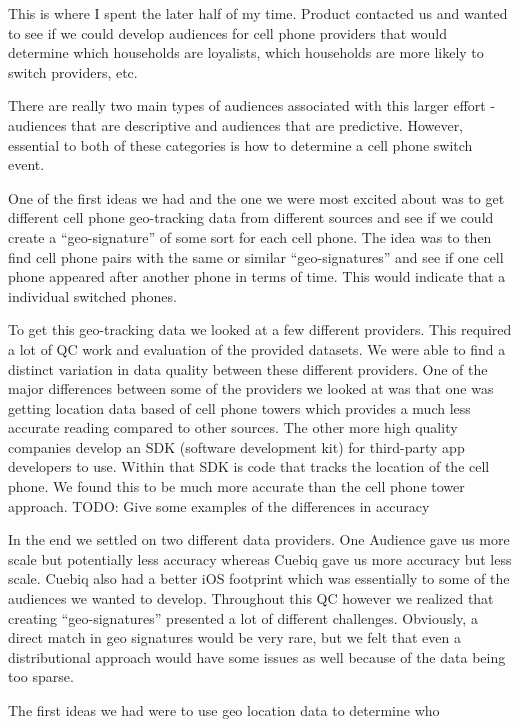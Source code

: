 \documentclass[paper=a4, fontsize=11pt]{scrartcl} %
\numberwithin{equation}{section} %
\numberwithin{figure}{section} %
\numberwithin{table}{section} %
\begin{document}
This is where I spent the later half of my time. Product contacted us and wanted to see if we could develop audiences for cell phone providers that would determine which households are loyalists, which households are more likely to switch providers, etc.

There are really two main types of audiences associated with this larger effort - audiences that are descriptive and audiences that are predictive. However, essential to both of these categories is how to determine a cell phone switch event.

One of the first ideas we had and the one we were most excited about was to get different cell phone geo-tracking data from different sources and see if we could create a ``geo-signature'' of some sort for each cell phone. The idea was to then find cell phone pairs with the same or similar ``geo-signatures'' and see if one cell phone appeared after another phone in terms of time. This would indicate that a individual switched phones.

To get this geo-tracking data we looked at a few different providers. This required a lot of QC work and evaluation of the provided datasets. We were able to find a distinct variation in data quality between these different providers. One of the major differences between some of the providers we looked at was that one was getting location data based of cell phone towers which provides a much less accurate reading compared to other sources. The other more high quality companies develop an SDK (software development kit) for third-party app developers to use. Within that SDK is code that tracks the location of the cell phone. We found this to be much more accurate than the cell phone tower approach. TODO: Give some examples of the differences in accuracy

In the end we settled on two different data providers. One Audience gave us more scale but potentially less accuracy whereas Cuebiq gave us more accuracy but less scale. Cuebiq also had a better iOS footprint which was essentially to some of the audiences we wanted to develop. Throughout this QC however we realized that creating ``geo-signatures'' presented a lot of different challenges. Obviously, a direct match in geo signatures would be very rare, but we felt that even a distributional approach would have some issues as well because of the data being too sparse.


The first ideas we had were to use geo location data to determine who 
\end{document}
